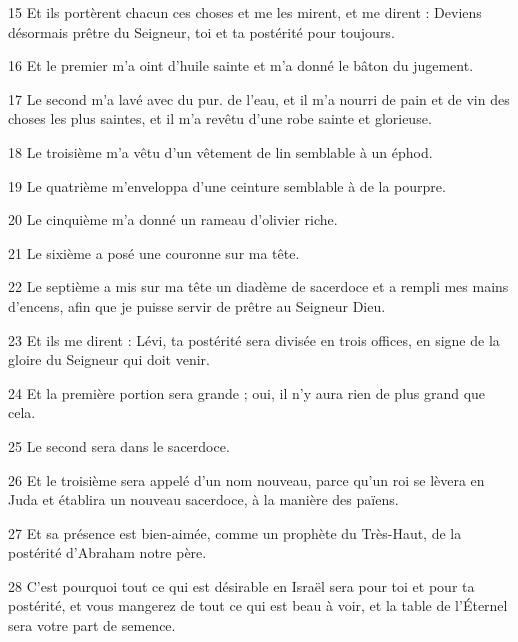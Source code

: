 \par 15 Et ils portèrent chacun ces choses et me les mirent, et me dirent : Deviens désormais prêtre du Seigneur, toi et ta postérité pour toujours.

\par 16 Et le premier m'a oint d'huile sainte et m'a donné le bâton du jugement.

\par 17 Le second m'a lavé avec du pur. de l'eau, et il m'a nourri de pain et de vin des choses les plus saintes, et il m'a revêtu d'une robe sainte et glorieuse.

\par 18 Le troisième m'a vêtu d'un vêtement de lin semblable à un éphod.

\par 19 Le quatrième m'enveloppa d'une ceinture semblable à de la pourpre.

\par 20 Le cinquième m'a donné un rameau d'olivier riche.

\par 21 Le sixième a posé une couronne sur ma tête.

\par 22 Le septième a mis sur ma tête un diadème de sacerdoce et a rempli mes mains d'encens, afin que je puisse servir de prêtre au Seigneur Dieu.

\par 23 Et ils me dirent : Lévi, ta postérité sera divisée en trois offices, en signe de la gloire du Seigneur qui doit venir.

\par 24 Et la première portion sera grande ; oui, il n'y aura rien de plus grand que cela.

\par 25 Le second sera dans le sacerdoce.

\par 26 Et le troisième sera appelé d'un nom nouveau, parce qu'un roi se lèvera en Juda et établira un nouveau sacerdoce, à la manière des païens.

\par 27 Et sa présence est bien-aimée, comme un prophète du Très-Haut, de la postérité d'Abraham notre père.

\par 28 C'est pourquoi tout ce qui est désirable en Israël sera pour toi et pour ta postérité, et vous mangerez de tout ce qui est beau à voir, et la table de l'Éternel sera votre part de semence.

